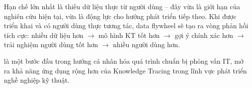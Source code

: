 Hạn chế lớn nhất là thiếu dữ liệu thực từ người dùng -- đây vừa là giới hạn của nghiên cứu hiện tại, vừa là động lực cho hướng phát triển tiếp theo. Khi \system{} được triển khai và có người dùng thực tương tác, data flywheel sẽ tạo ra vòng phản hồi tích cực: nhiều dữ liệu hơn $\to$ mô hình KT tốt hơn $\to$ gợi ý chính xác hơn $\to$ trải nghiệm người dùng tốt hơn $\to$ nhiều người dùng hơn.

\system{} là một bước đầu trong hướng cá nhân hóa quá trình chuẩn bị phỏng vấn IT, mở ra khả năng ứng dụng rộng hơn của Knowledge Tracing trong lĩnh vực phát triển nghề nghiệp kỹ thuật.
